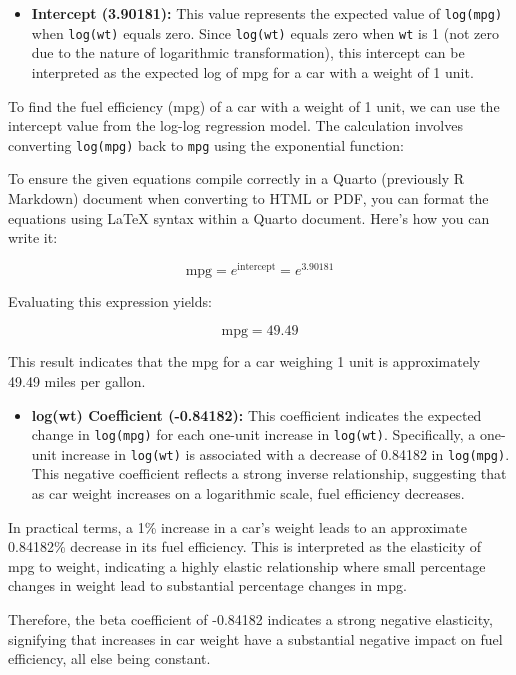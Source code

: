 \documentclass[
  letterpaper,
  DIV=11,
  numbers=noendperiod]{scrreport}
\providecommand{\tightlist}{%
  \setlength{\itemsep}{0pt}\setlength{\parskip}{0pt}}\usepackage{longtable,booktabs,array}
\begin{document}
\begin{itemize}
\tightlist
\item
  \textbf{Intercept (3.90181):} This value represents the expected value
  of \texttt{log(mpg)} when \texttt{log(wt)} equals zero. Since
  \texttt{log(wt)} equals zero when \texttt{wt} is 1 (not zero due to
  the nature of logarithmic transformation), this intercept can be
  interpreted as the expected log of mpg for a car with a weight of 1
  unit.
\end{itemize}

To find the fuel efficiency (mpg) of a car with a weight of 1 unit, we
can use the intercept value from the log-log regression model. The
calculation involves converting \texttt{log(mpg)} back to \texttt{mpg}
using the exponential function:

To ensure the given equations compile correctly in a Quarto (previously
R Markdown) document when converting to HTML or PDF, you can format the
equations using LaTeX syntax within a Quarto document. Here's how you
can write it:

\[
\text{mpg} = e^{\text{intercept}} = e^{3.90181}
\]

Evaluating this expression yields:

\[
\text{mpg} = 49.49
\]

This result indicates that the mpg for a car weighing 1 unit is
approximately 49.49 miles per gallon.

\begin{itemize}
\tightlist
\item
  \textbf{log(wt) Coefficient (-0.84182):} This coefficient indicates
  the expected change in \texttt{log(mpg)} for each one-unit increase in
  \texttt{log(wt)}. Specifically, a one-unit increase in
  \texttt{log(wt)} is associated with a decrease of 0.84182 in
  \texttt{log(mpg)}. This negative coefficient reflects a strong inverse
  relationship, suggesting that as car weight increases on a logarithmic
  scale, fuel efficiency decreases.
\end{itemize}

In practical terms, a 1\% increase in a car's weight leads to an
approximate 0.84182\% decrease in its fuel efficiency. This is
interpreted as the elasticity of mpg to weight, indicating a highly
elastic relationship where small percentage changes in weight lead to
substantial percentage changes in mpg.

Therefore, the beta coefficient of -0.84182 indicates a strong negative
elasticity, signifying that increases in car weight have a substantial
negative impact on fuel efficiency, all else being constant.
\end{document}
